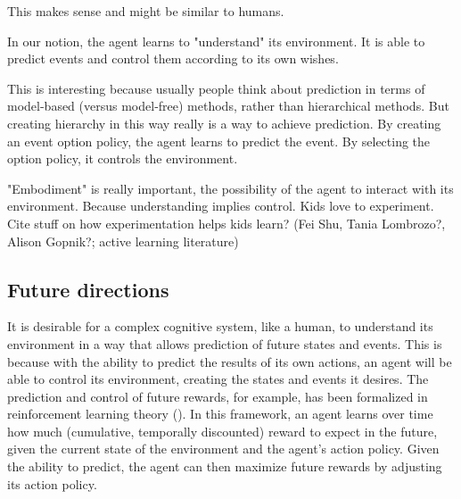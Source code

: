 \documentclass{article}
\begin{document}
This makes sense and might be similar to humans.

In our notion, the agent learns to "understand" its environment. It is able to predict events and control them according to its own wishes.

This is interesting because usually people think about prediction in terms of model-based (versus model-free) methods, rather than hierarchical methods. But creating hierarchy in this way really is a way to achieve prediction. By creating an event option policy, the agent learns to predict the event. By selecting the option policy, it controls the environment.

"Embodiment" is really important, the possibility of the agent to interact with its environment. Because understanding implies control. Kids love to experiment. Cite stuff on how experimentation helps kids learn? (Fei Shu, Tania Lombrozo?, Alison Gopnik?; active learning literature)

\subsection{Future directions}

It is desirable for a complex cognitive system, like a human, to understand its environment in a way that allows prediction of future states and events. This is because with the ability to predict the results of its own actions, an agent will be able to control its environment, creating the states and events it desires. The prediction and control of future rewards, for example, has been formalized in reinforcement learning theory (\cite{sutton_reinforcement_2017}). In this framework, an agent learns over time how much (cumulative, temporally discounted) reward to expect in the future, given the current state of the environment and the agent's action policy. Given the ability to predict, the agent can then maximize future rewards by adjusting its action policy.
\end{document}
